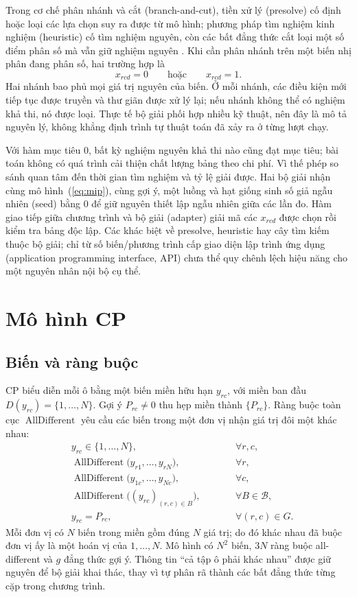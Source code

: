 \documentclass[a4paper]{cas-sc}
\newcommand{\AD}{\operatorname{AllDifferent}}
\begin{document}
Trong cơ chế phân nhánh và cắt (branch-and-cut), tiền xử lý (presolve) cố định hoặc loại các lựa chọn suy ra được từ mô hình; phương pháp tìm nghiệm kinh nghiệm (heuristic) cố tìm nghiệm nguyên, còn các bất đẳng thức cắt loại một số điểm phân số mà vẫn giữ nghiệm nguyên \citep{cplexBranch}. Khi cần phân nhánh trên một biến nhị phân đang phân số, hai trường hợp là
\begin{equation}
x_{rcd}=0\qquad\text{hoặc}\qquad x_{rcd}=1.
\end{equation}
Hai nhánh bao phủ mọi giá trị nguyên của biến. Ở mỗi nhánh, các điều kiện mới tiếp tục được truyền và thư giãn được xử lý lại; nếu nhánh không thể có nghiệm khả thi, nó được loại. Thực tế bộ giải phối hợp nhiều kỹ thuật, nên đây là mô tả nguyên lý, không khẳng định trình tự thuật toán đã xảy ra ở từng lượt chạy.

Với hàm mục tiêu 0, bất kỳ nghiệm nguyên khả thi nào cũng đạt mục tiêu; bài toán không có quá trình cải thiện chất lượng bảng theo chi phí. Vì thế phép so sánh quan tâm đến thời gian tìm nghiệm và tỷ lệ giải được. Hai bộ giải nhận cùng mô hình~(\ref{eq:mip}), cùng gợi ý, một luồng và hạt giống sinh số giả ngẫu nhiên (seed) bằng 0 để giữ nguyên thiết lập ngẫu nhiên giữa các lần đo. Hàm giao tiếp giữa chương trình và bộ giải (adapter) giải mã các $x_{rcd}$ được chọn rồi kiểm tra bảng độc lập. Các khác biệt về presolve, heuristic hay cây tìm kiếm thuộc bộ giải; chỉ từ số biến/phương trình cấp giao diện lập trình ứng dụng (application programming interface, API) chưa thể quy chênh lệch hiệu năng cho một nguyên nhân nội bộ cụ thể.

\section{Mô hình CP}
\subsection{Biến và ràng buộc}
CP biểu diễn mỗi ô bằng một biến miền hữu hạn $y_{rc}$, với miền ban đầu $D(y_{rc})=\{1,\ldots,N\}$. Gợi ý $P_{rc}\ne0$ thu hẹp miền thành $\{P_{rc}\}$. Ràng buộc toàn cục $\AD$ yêu cầu các biến trong một đơn vị nhận giá trị đôi một khác nhau:
\begin{equation}\label{eq:cp}
\begin{alignedat}{2}
&y_{rc}\in\{1,\ldots,N\}, &\qquad&\forall r,c,\\
&\AD\bigl(y_{r1},\ldots,y_{rN}\bigr), &&\forall r,\\
&\AD\bigl(y_{1c},\ldots,y_{Nc}\bigr), &&\forall c,\\
&\AD\bigl((y_{rc})_{(r,c)\in B}\bigr), &&\forall B\in\mathcal B,\\
&y_{rc}=P_{rc}, &&\forall(r,c)\in G.
\end{alignedat}
\end{equation}
Mỗi đơn vị có $N$ biến trong miền gồm đúng $N$ giá trị; do đó khác nhau đã buộc đơn vị ấy là một hoán vị của $1,\ldots,N$. Mô hình có $N^2$ biến, $3N$ ràng buộc all-different và $g$ đẳng thức gợi ý. Thông tin ``cả tập ô phải khác nhau'' được giữ nguyên để bộ giải khai thác, thay vì tự phân rã thành các bất đẳng thức từng cặp trong chương trình.
\end{document}
